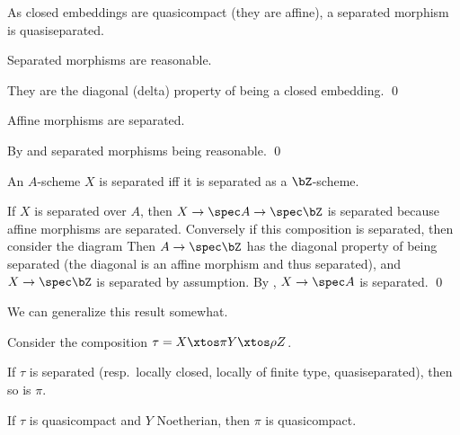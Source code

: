 \edefn

\bremark

    As closed embeddings are quasicompact (they are affine), a separated morphism is quasiseparated.

\eremark

\bprop

    Separated morphisms are reasonable.

\eprop

\bproof

    They are the diagonal (delta) property of being a closed embedding.
    \qed

\eproof

\bprop

    Affine morphisms are separated.

\eprop

\bproof

    By  and separated morphisms being reasonable.
    \qed

\eproof

\bprop

    An $A$-scheme $X$ is separated iff it is separated as a $\bZ$-scheme.

\eprop

\bproof

    If $X$ is separated over $A$, then $X\to\spec A\to\spec\bZ$ is separated because affine morphisms are
    separated.
    Conversely if this composition is separated, then consider the diagram
    Then $A\to\spec\bZ$ has the diagonal property of being separated (the diagonal is an affine morphism
    and thus separated), and $X\to\spec\bZ$ is separated by assumption.
    By , $X\to\spec A$ is separated.
    \qed

\eproof

We can generalize this result somewhat.

\bprop

    Consider the composition $\tau=X\xtos\pi Y\xtos\rho Z$.
    \benum
        \item If $\tau$ is separated (resp.\ locally closed, locally of finite type, quasiseparated),
        then so is $\pi$.
        \item If $\tau$ is quasicompact and $Y$ Noetherian, then $\pi$ is quasicompact.
    \eenum

